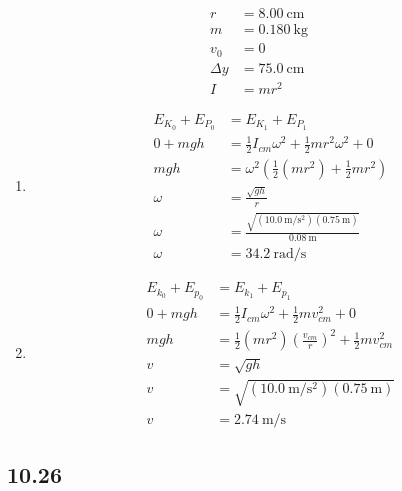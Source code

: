 \documentclass{article}
\begin{document}
\begin{align*}
	r & = \SI{8.00}{\centi \meter} \\
	m & = \SI{0.180}{\kilogram} \\
	v_0 & = 0 \\
	\Delta y & = \SI{75.0}{\centi \meter} \\
	I & = mr^2
\end{align*}
\begin{enumerate}[label = \boldalpha]
	\item
		\begin{align*}
			E_{K_0} + E_{P_0} & = E_{K_1} + E_{P_1} \\
			0 + mgh & = \frac{1}{2}I_{cm}\omega^2 + \frac{1}{2}mr^2\omega^2 + 0 \\
			mgh & = \omega^2 \left( \frac{1}{2} \left( mr^2 \right) + \frac{1}{2}mr^2 \right) \\
			\omega & = \frac{ \sqrt{ gh } }{ r } \\
			\omega & = \frac{ \sqrt{ (\SI{10.0}{\meter \per \second \squared})(\SI{0.75}{\meter}) } }{ \SI{0.08}{\meter} } \\
			\omega & = \SI{34.2}{\radian \per \second}
		\end{align*}
	\item
		\begin{align*}
			E_{k_0} + E_{p_0} & = E_{k_1} + E_{p_1} \\
			0 + mgh & = \frac{1}{2}I_{cm}\omega^2 + \frac{1}{2}mv_{cm}^2 + 0 \\
			mgh & = \frac{1}{2}(mr^2) \left( \frac{v_{cm}}{r} \right)^2 + \frac{1}{2}mv_{cm}^2 \\
			v & = \sqrt{ gh } \\
			v & = \sqrt{ (\SI{10.0}{\meter \per \second \squared})(\SI{0.75}{\meter}) } \\
			v & = \SI{2.74}{\meter \per \second}
		\end{align*}
\end{enumerate}

\subsection{10.26}
\end{document}
